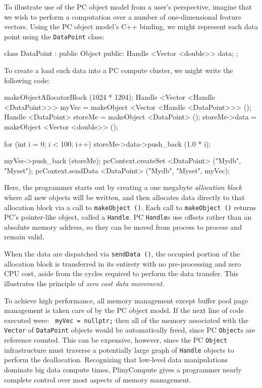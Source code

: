 To illustrate use of the PC object model from a user's perspective,
imagine that we wish to perform a computation over a number of one-dimensional feature vectors.  
Using the PC object model's C++ binding, we might represent each data point using the 
\texttt{DataPoint} class:

\begin{codesmall}
class DataPoint : public Object {
public:
	Handle <Vector <double>> data;
};
\end{codesmall}

\noindent
To create a load such data into a PC compute cluster, we might write the following code:

\begin{codesmall}
makeObjectAllocatorBlock (1024 * 1204);
Handle <Vector <Handle <DataPoint>>> myVec = 
     makeObject <Vector <Handle <DataPoint>>> ();
Handle <DataPoint> storeMe = makeObject <DataPoint> ();
storeMe->data = makeObject <Vector <double>> ();

for (int i = 0; i < 100; i++) 
     storeMe->data->push_back (1.0 * i);

myVec->push_back (storeMe);
pcContext.createSet <DataPoint> ("Mydb", "Myset");
pcContext.sendData <DataPoint> ("Mydb", "Myset", myVec);
\end{codesmall}

\noindent
Here, the programmer starts out by creating a one megabyte \emph{allocation block} where all new objects will be written,
and then allocates data directly to that allocation block via a call to \texttt{makeObject ()}.  Each call to  \texttt{makeObject ()}
returns PC's pointer-like object, called a \texttt{Handle}.  PC \texttt{Handle}s use offsets rather than an absolute memory
address, so they can be moved from process to process and remain valid.  

When the data are dispatched via \texttt{sendData ()},
the occupied
portion of the allocation block is transferred in its entirety with
no pre-processing and zero CPU cost, aside from the cycles required to perform the data transfer.  
This illustrates the principle of \emph{zero cost data movement}.

To achieve high performance, all memory management except buffer pool
page management is taken care of by the PC object model.
If the next line of code executed were:
\texttt{
myVec = nullptr;}
then all of the memory associated with the \texttt{Vector} of \texttt{DataPoint} objects would be automatically
freed, since PC \texttt{Object}s are reference counted.  This can
be expensive, however, since the PC \texttt{Object} infrastructure must traverse a potentially large graph of \texttt{Handle} objects to perform the deallocation.  
Recognizing that low-level data manipulations dominate big data
compute times, PlinyCompute gives a programmer nearly complete control
over most aspects of memory management.

